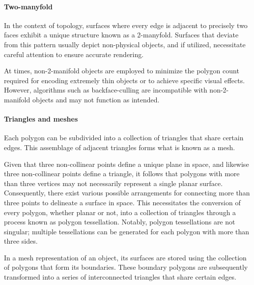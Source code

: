 \paragraph*{Two-manyfold}
In the context of topology, surfaces where every edge is adjacent to precisely two faces exhibit a unique structure known as a 2-manyfold. 
Surfaces that deviate from this pattern usually depict non-physical objects, and if utilized, necessitate careful attention to ensure accurate rendering.

At times, non-2-manifold objects are employed to minimize the polygon count required for encoding extremely thin objects or to achieve specific visual effects.
However, algorithms such as backface-culling are incompatible with non-2-manifold objects and may not function as intended.

\paragraph*{Triangles and meshes}
Each polygon can be subdivided into a collection of triangles that share certain edges. 
This assemblage of adjacent triangles forms what is known as a mesh.

Given that three non-collinear points define a unique plane in space, and likewise three non-collinear points define a triangle, it follows that polygons with more than three vertices may not necessarily represent a single planar surface. 
Consequently, there exist various possible arrangements for connecting more than three points to delineate a surface in space. 
This necessitates the conversion of every polygon, whether planar or not, into a collection of triangles through a process known as polygon tessellation. 
Notably, polygon tessellations are not singular; multiple tessellations can be generated for each polygon with more than three sides.

In a mesh representation of an object, its surfaces are stored using the collection of polygons that form its boundaries. 
These boundary polygons are subsequently transformed into a series of interconnected triangles that share certain edges.